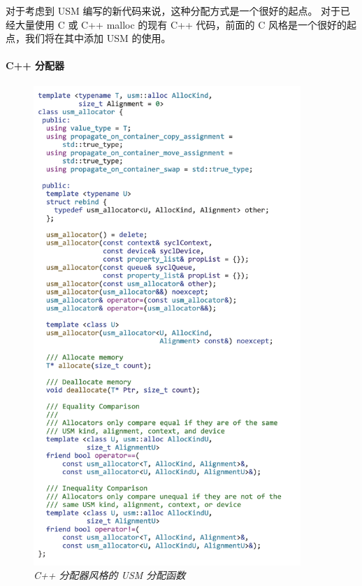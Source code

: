 对于考虑到 USM 编写的新代码来说，这种分配方式是一个很好的起点。 
对于已经大量使用 C 或 C++ malloc 的现有 C++ 代码，前面的 C 风格是一个很好的起点，我们将在其中添加 USM 的使用。

\paragraph{C++ 分配器}

\begin{figure}[H]
	\centering
	\includegraphics[width=0.9\textwidth]{figs/F6.4.png}
	\caption{\textit{C++ 分配器风格的 USM 分配函数}}
\end{figure}

